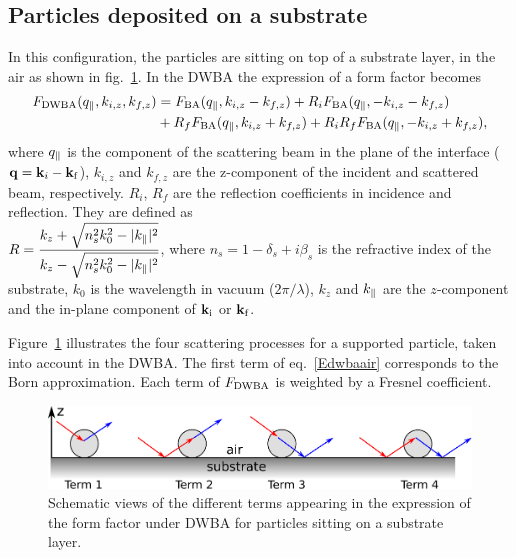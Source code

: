 \subsection{Particles deposited on a substrate}
In this configuration, the particles are sitting on top of a substrate layer, in the air as shown in fig.~\ref{fig:SchemDWBA}. In the DWBA the expression of a form factor becomes 
\begin{align}
F_{\rm{DWBA}}(q_{\parallel}, k_{i,z}, k_{f,z}) &= F_{\rm{BA}}(q_{\parallel}, k_{i,z}-k_{f,z})+ R_i F_{\rm{BA}}(q_{\parallel}, -k_{i,z}-k_{f,z}) \nonumber \\
&+ R_f F_{\rm{BA}}(q_{\parallel}, k_{i,z}+k_{f,z}) + R_i R_f F_{\rm{BA}}(q_{\parallel},-k_{i,z}+k_{f,z}), \label{Edwbaair}
\end{align}
where $q_{\parallel}$ is the component of the scattering beam in the plane of the interface ($\mathbf{q}=\mathbf{k}_i-\mathbf{k}_\text{f}$), $k_{i,z}$ and $k_{f,z}$ are the z-component of the incident and scattered beam, respectively. $R_i$, $R_f$ are the reflection coefficients in incidence and reflection. They are defined as\\ $R=\dfrac{k_z+\sqrt{n_s^2k_0^2-|k_{\parallel}|^2}}{k_z-\sqrt{n_s^2 k_0^2-|k_{\parallel}|^2}}$, where $n_s=1-\delta_s +i \beta_s$ is the refractive index of the substrate, $k_0$ is the wavelength in vacuum ($2\pi /\lambda$), $k_z$ and $k_{\parallel}$ are the $z$-component and the in-plane component of $\mathbf{k}_\text{i}$ or $\mathbf{k}_\text{f}$. \\


\vspace{18pt}

Figure~\ref{fig:SchemDWBA} illustrates the four scattering processes for a supported particle, taken into account in the DWBA. The first term of eq.~\ref{Edwbaair}  corresponds to the Born approximation. Each term of $F_{\rm{DWBA}}$ is weighted by a Fresnel coefficient. 

\begin{figure}[tb]
\begin{center}
\includegraphics[width=\textwidth]{fig/drawing/drawingDWBA.pdf}
\end{center}
\caption{Schematic views of the different terms appearing in the expression of the form factor under DWBA for particles sitting on a substrate layer.}
\label{fig:SchemDWBA}
\end{figure}



